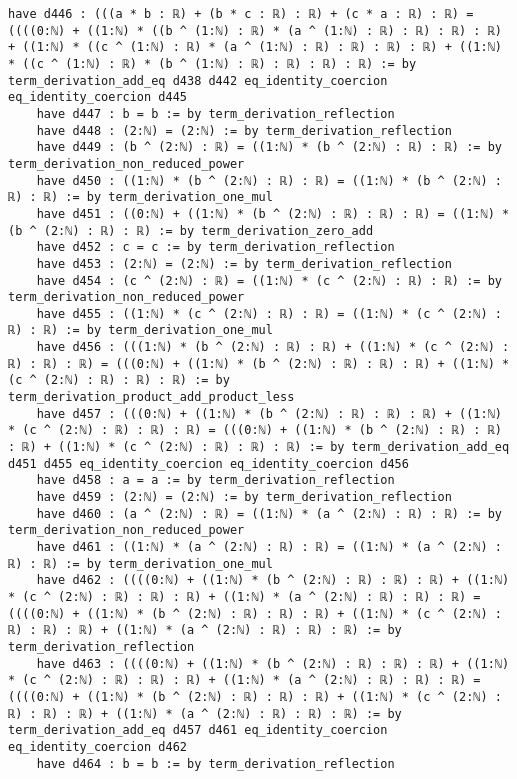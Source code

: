 \documentclass{article}
\begin{document}
\begin{tcolorbox}[colback=white!10, width=\linewidth]
\begin{lstlisting}[language=Lean4]
    have d446 : (((a * b : ℝ) + (b * c : ℝ) : ℝ) + (c * a : ℝ) : ℝ) = ((((0:ℕ) + ((1:ℕ) * ((b ^ (1:ℕ) : ℝ) * (a ^ (1:ℕ) : ℝ) : ℝ) : ℝ) : ℝ) + ((1:ℕ) * ((c ^ (1:ℕ) : ℝ) * (a ^ (1:ℕ) : ℝ) : ℝ) : ℝ) : ℝ) + ((1:ℕ) * ((c ^ (1:ℕ) : ℝ) * (b ^ (1:ℕ) : ℝ) : ℝ) : ℝ) : ℝ) := by term_derivation_add_eq d438 d442 eq_identity_coercion eq_identity_coercion d445
    have d447 : b = b := by term_derivation_reflection
    have d448 : (2:ℕ) = (2:ℕ) := by term_derivation_reflection
    have d449 : (b ^ (2:ℕ) : ℝ) = ((1:ℕ) * (b ^ (2:ℕ) : ℝ) : ℝ) := by term_derivation_non_reduced_power
    have d450 : ((1:ℕ) * (b ^ (2:ℕ) : ℝ) : ℝ) = ((1:ℕ) * (b ^ (2:ℕ) : ℝ) : ℝ) := by term_derivation_one_mul
    have d451 : ((0:ℕ) + ((1:ℕ) * (b ^ (2:ℕ) : ℝ) : ℝ) : ℝ) = ((1:ℕ) * (b ^ (2:ℕ) : ℝ) : ℝ) := by term_derivation_zero_add
    have d452 : c = c := by term_derivation_reflection
    have d453 : (2:ℕ) = (2:ℕ) := by term_derivation_reflection
    have d454 : (c ^ (2:ℕ) : ℝ) = ((1:ℕ) * (c ^ (2:ℕ) : ℝ) : ℝ) := by term_derivation_non_reduced_power
    have d455 : ((1:ℕ) * (c ^ (2:ℕ) : ℝ) : ℝ) = ((1:ℕ) * (c ^ (2:ℕ) : ℝ) : ℝ) := by term_derivation_one_mul
    have d456 : (((1:ℕ) * (b ^ (2:ℕ) : ℝ) : ℝ) + ((1:ℕ) * (c ^ (2:ℕ) : ℝ) : ℝ) : ℝ) = (((0:ℕ) + ((1:ℕ) * (b ^ (2:ℕ) : ℝ) : ℝ) : ℝ) + ((1:ℕ) * (c ^ (2:ℕ) : ℝ) : ℝ) : ℝ) := by term_derivation_product_add_product_less
    have d457 : (((0:ℕ) + ((1:ℕ) * (b ^ (2:ℕ) : ℝ) : ℝ) : ℝ) + ((1:ℕ) * (c ^ (2:ℕ) : ℝ) : ℝ) : ℝ) = (((0:ℕ) + ((1:ℕ) * (b ^ (2:ℕ) : ℝ) : ℝ) : ℝ) + ((1:ℕ) * (c ^ (2:ℕ) : ℝ) : ℝ) : ℝ) := by term_derivation_add_eq d451 d455 eq_identity_coercion eq_identity_coercion d456
    have d458 : a = a := by term_derivation_reflection
    have d459 : (2:ℕ) = (2:ℕ) := by term_derivation_reflection
    have d460 : (a ^ (2:ℕ) : ℝ) = ((1:ℕ) * (a ^ (2:ℕ) : ℝ) : ℝ) := by term_derivation_non_reduced_power
    have d461 : ((1:ℕ) * (a ^ (2:ℕ) : ℝ) : ℝ) = ((1:ℕ) * (a ^ (2:ℕ) : ℝ) : ℝ) := by term_derivation_one_mul
    have d462 : ((((0:ℕ) + ((1:ℕ) * (b ^ (2:ℕ) : ℝ) : ℝ) : ℝ) + ((1:ℕ) * (c ^ (2:ℕ) : ℝ) : ℝ) : ℝ) + ((1:ℕ) * (a ^ (2:ℕ) : ℝ) : ℝ) : ℝ) = ((((0:ℕ) + ((1:ℕ) * (b ^ (2:ℕ) : ℝ) : ℝ) : ℝ) + ((1:ℕ) * (c ^ (2:ℕ) : ℝ) : ℝ) : ℝ) + ((1:ℕ) * (a ^ (2:ℕ) : ℝ) : ℝ) : ℝ) := by term_derivation_reflection
    have d463 : ((((0:ℕ) + ((1:ℕ) * (b ^ (2:ℕ) : ℝ) : ℝ) : ℝ) + ((1:ℕ) * (c ^ (2:ℕ) : ℝ) : ℝ) : ℝ) + ((1:ℕ) * (a ^ (2:ℕ) : ℝ) : ℝ) : ℝ) = ((((0:ℕ) + ((1:ℕ) * (b ^ (2:ℕ) : ℝ) : ℝ) : ℝ) + ((1:ℕ) * (c ^ (2:ℕ) : ℝ) : ℝ) : ℝ) + ((1:ℕ) * (a ^ (2:ℕ) : ℝ) : ℝ) : ℝ) := by term_derivation_add_eq d457 d461 eq_identity_coercion eq_identity_coercion d462
    have d464 : b = b := by term_derivation_reflection

\end{lstlisting}
\end{tcolorbox}
\end{document}
